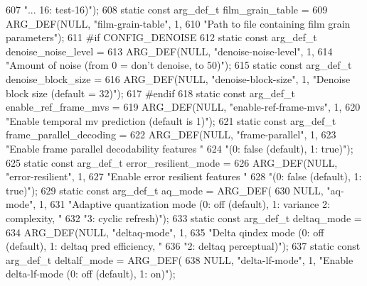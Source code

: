 \begin{DoxyCodeInclude}
{{{{{{{607             \textcolor{stringliteral}{"... 16: test-16)"});
608 \textcolor{keyword}{static} \textcolor{keyword}{const} arg\_def\_t film\_grain\_table =
609     ARG\_DEF(NULL, \textcolor{stringliteral}{"film-grain-table"}, 1,
610             \textcolor{stringliteral}{"Path to file containing film grain parameters"});
611 \textcolor{preprocessor}{#if CONFIG\_DENOISE}
612 \textcolor{keyword}{static} \textcolor{keyword}{const} arg\_def\_t denoise\_noise\_level =
613     ARG\_DEF(NULL, \textcolor{stringliteral}{"denoise-noise-level"}, 1,
614             \textcolor{stringliteral}{"Amount of noise (from 0 = don't denoise, to 50)"});
615 \textcolor{keyword}{static} \textcolor{keyword}{const} arg\_def\_t denoise\_block\_size =
616     ARG\_DEF(NULL, \textcolor{stringliteral}{"denoise-block-size"}, 1, \textcolor{stringliteral}{"Denoise block size (default = 32)"});
617 \textcolor{preprocessor}{#endif}
618 \textcolor{keyword}{static} \textcolor{keyword}{const} arg\_def\_t enable\_ref\_frame\_mvs =
619     ARG\_DEF(NULL, \textcolor{stringliteral}{"enable-ref-frame-mvs"}, 1,
620             \textcolor{stringliteral}{"Enable temporal mv prediction (default is 1)"});
621 \textcolor{keyword}{static} \textcolor{keyword}{const} arg\_def\_t frame\_parallel\_decoding =
622     ARG\_DEF(NULL, \textcolor{stringliteral}{"frame-parallel"}, 1,
623             \textcolor{stringliteral}{"Enable frame parallel decodability features "}
624             \textcolor{stringliteral}{"(0: false (default), 1: true)"});
625 \textcolor{keyword}{static} \textcolor{keyword}{const} arg\_def\_t error\_resilient\_mode =
626     ARG\_DEF(NULL, \textcolor{stringliteral}{"error-resilient"}, 1,
627             \textcolor{stringliteral}{"Enable error resilient features "}
628             \textcolor{stringliteral}{"(0: false (default), 1: true)"});
629 \textcolor{keyword}{static} \textcolor{keyword}{const} arg\_def\_t aq\_mode = ARG\_DEF(
630     NULL, \textcolor{stringliteral}{"aq-mode"}, 1,
631     \textcolor{stringliteral}{"Adaptive quantization mode (0: off (default), 1: variance 2: complexity, "}
632     \textcolor{stringliteral}{"3: cyclic refresh)"});
633 \textcolor{keyword}{static} \textcolor{keyword}{const} arg\_def\_t deltaq\_mode =
634     ARG\_DEF(NULL, \textcolor{stringliteral}{"deltaq-mode"}, 1,
635             \textcolor{stringliteral}{"Delta qindex mode (0: off (default), 1: deltaq pred efficiency, "}
636             \textcolor{stringliteral}{"2: deltaq perceptual)"});
637 \textcolor{keyword}{static} \textcolor{keyword}{const} arg\_def\_t deltalf\_mode = ARG\_DEF(
638     NULL, \textcolor{stringliteral}{"delta-lf-mode"}, 1, \textcolor{stringliteral}{"Enable delta-lf-mode (0: off (default), 1: on)"});
}}}}}}}
\end{DoxyCodeInclude}
